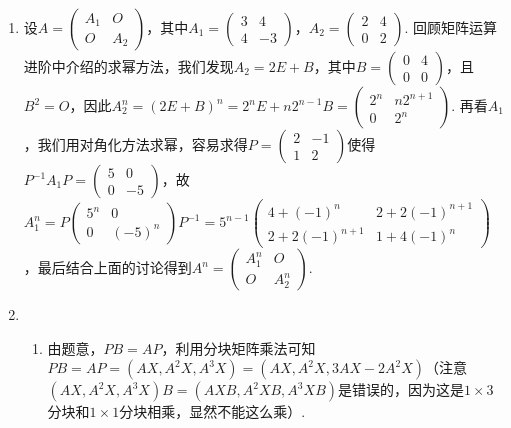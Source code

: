 \begin{enumerate}
    \item 设$A=\begin{pmatrix}
                  A_1 & O \\ O & A_2
              \end{pmatrix}$，其中$A_1=\begin{pmatrix}
                  3 & 4 \\ 4 & -3
              \end{pmatrix}$，$A_2=\begin{pmatrix}
                  2 & 4 \\ 0 & 2
              \end{pmatrix}$. 回顾矩阵运算进阶中介绍的求幂方法，我们发现$A_2=2E+B$，其中$B=\begin{pmatrix}
                  0 & 4 \\ 0 & 0
              \end{pmatrix}$，且$B^2=O$，因此$A_2^n=(2E+B)^n=2^nE+n2^{n-1}B=\begin{pmatrix}
                  2^n & n2^{n+1} \\ 0 & 2^n
              \end{pmatrix}$. 再看$A_1$，我们用对角化方法求幂，容易求得$P=\begin{pmatrix}
                  2 & -1 \\ 1 & 2
              \end{pmatrix}$使得$P^{-1}A_1P=\begin{pmatrix}
                  5 & 0 \\ 0 & -5
              \end{pmatrix}$，故$A_1^n=P\begin{pmatrix}
                  5^n & 0 \\ 0 & (-5)^n
              \end{pmatrix}P^{-1}=5^{n-1}\begin{pmatrix}
                  4+(-1)^n & 2+2(-1)^{n+1} \\ 2+2(-1)^{n+1} & 1+4(-1)^n
              \end{pmatrix}$，最后结合上面的讨论得到$A^n=\begin{pmatrix}
                  A_1^n & O \\ O & A_2^n
              \end{pmatrix}$.

    \item \begin{enumerate}
              \item 由题意，$PB=AP$，利用分块矩阵乘法可知$PB=AP=(AX,A^2X,A^3X)=(AX,A^2X,3AX-2A^2X)$（注意$(AX,A^2X,A^3X)B=(AXB,A^2XB,A^3XB)$是错误的，因为这是$1\times 3$分块和$1\times 1$分块相乘，显然不能这么乘）.


\end{enumerate}
\end{enumerate}
